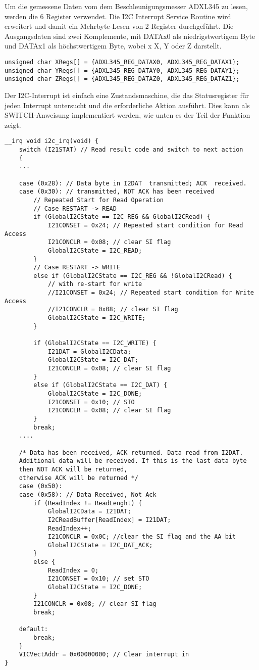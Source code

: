 Um die gemessene Daten vom dem Beschleunigungsmesser ADXL345 zu lesen, werden die 6  Register verwendet. Die I2C Interrupt Service Routine wird erweitert und damit ein Mehrbyte-Lesen von 2 Register durchgeführt. Die Ausgangsdaten sind zwei Komplemente, mit DATAx0 als niedrigstwertigem Byte und DATAx1 als höchstwertigem Byte, wobei x X, Y oder Z darstellt. 
\begin{lstlisting}
unsigned char XRegs[] = {ADXL345_REG_DATAX0, ADXL345_REG_DATAX1};
unsigned char YRegs[] = {ADXL345_REG_DATAY0, ADXL345_REG_DATAY1};
unsigned char ZRegs[] = {ADXL345_REG_DATAZ0, ADXL345_REG_DATAZ1};
\end{lstlisting}
	
Der I2C-Interrupt ist einfach eine Zustandsmaschine, die das Statusregister für jeden Interrupt untersucht und die erforderliche Aktion ausführt. Dies kann als SWITCH-Anweisung implementiert werden, wie unten es der Teil der Funktion zeigt.
\begin{lstlisting}
__irq void i2c_irq(void) {
	switch (I21STAT) // Read result code and switch to next action
	{
	...
	
	case (0x28): // Data byte in I2DAT  transmitted; ACK  received.
	case (0x30): // transmitted, NOT ACK has been received
		// Repeated Start for Read Operation
		// Case RESTART -> READ
		if (GlobalI2CState == I2C_REG && GlobalI2CRead) {
			I21CONSET = 0x24; // Repeated start condition for Read Access
			I21CONCLR = 0x08; // clear SI flag
			GlobalI2CState = I2C_READ;
		}
		// Case RESTART -> WRITE
		else if (GlobalI2CState == I2C_REG && !GlobalI2CRead) {
			// with re-start for write
			//I21CONSET = 0x24; // Repeated start condition for Write Access
			//I21CONCLR = 0x08; // clear SI flag
			GlobalI2CState = I2C_WRITE;
		}
		
		if (GlobalI2CState == I2C_WRITE) {
			I21DAT = GlobalI2CData;
			GlobalI2CState = I2C_DAT;
			I21CONCLR = 0x08; // clear SI flag
		}
		else if (GlobalI2CState == I2C_DAT) {
			GlobalI2CState = I2C_DONE;
			I21CONSET = 0x10; // STO
			I21CONCLR = 0x08; // clear SI flag
		}
		break;
	....
	
	/* Data has been received, ACK returned. Data read from I2DAT.
	Additional data will be received. If this is the last data byte 
	then NOT ACK will be returned,
	otherwise ACK will be returned */
	case (0x50):
	case (0x58): // Data Received, Not Ack
		if (ReadIndex != ReadLenght) {
			GlobalI2CData = I21DAT;
			I2CReadBuffer[ReadIndex] = I21DAT;
			ReadIndex++;
			I21CONCLR = 0x0C; //clear the SI flag and the AA bit
			GlobalI2CState = I2C_DAT_ACK;
		}
		else {
			ReadIndex = 0;
			I21CONSET = 0x10; // set STO
			GlobalI2CState = I2C_DONE;
		}
		I21CONCLR = 0x08; // clear SI flag
		break;
	
	default:
		break;
	}	
	VICVectAddr = 0x00000000; // Clear interrupt in
}
\end{lstlisting}


